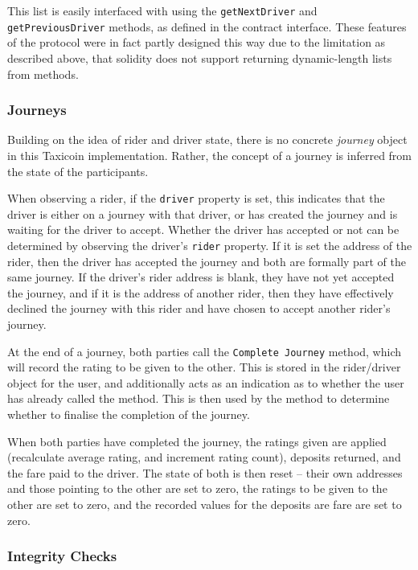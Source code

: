 This list is easily interfaced with using the \lstinline{getNextDriver} and \lstinline{getPreviousDriver} methods, as defined in the contract interface. These features of the protocol were in fact partly designed this way due to the limitation as described above, that solidity does not support returning dynamic-length lists from methods.

\subsubsection{Journeys}

Building on the idea of rider and driver state, there is no concrete \textit{journey} object in this Taxicoin implementation. Rather, the concept of a journey is inferred from the state of the participants.

When observing a rider, if the \lstinline{driver} property is set, this indicates that the driver is either on a journey with that driver, or has created the journey and is waiting for the driver to accept. Whether the driver has accepted or not can be determined by observing the driver's \lstinline{rider} property. If it is set the address of the rider, then the driver has accepted the journey and both are formally part of the same journey. If the driver's rider address is blank, they have not yet accepted the journey, and if it is the address of another rider, then they have effectively declined the journey with this rider and have chosen to accept another rider's journey.

At the end of a journey, both parties call the \lstinline{Complete Journey} method, which will record the rating to be given to the other. This is stored in the rider/driver object for the user, and additionally acts as an indication as to whether the user has already called the method. This is then used by the method to determine whether to finalise the completion of the journey.

When both parties have completed the journey, the ratings given are applied (recalculate average rating, and increment rating count), deposits returned, and the fare paid to the driver. The state of both is then reset -- their own addresses and those pointing to the other are set to zero, the ratings to be given to the other are set to zero, and the recorded values for the deposits are fare are set to zero.


\subsubsection{Integrity Checks}


